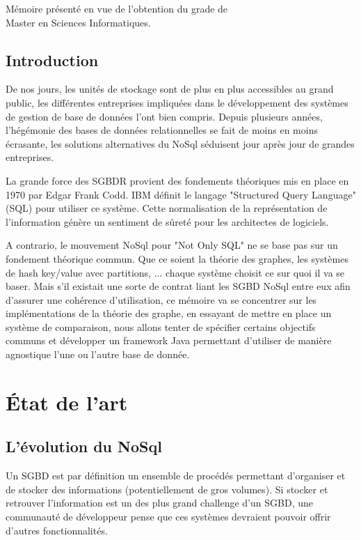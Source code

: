 \documentclass[a4paper,fleqn,12pt]{report}
\begin{document}
\vspace{0.5cm}
\begin{center}
M\'emoire pr\'esent\'e en vue de l'obtention du grade de\\
Master en Sciences Informatiques.
\end{center}
\tableofcontents
\newpage


\chapter*{Introduction}

De nos jours, les unités de stockage sont de plus en plus accessibles au grand public, les différentes entreprises impliquées dans le développement des systèmes de gestion de base de données l'ont bien compris. Depuis plusieurs années, l'hégémonie des bases de données relationnelles se fait de moins en moins écrasante, les solutions alternatives du NoSql séduisent jour après jour de grandes entreprises. 

La grande force des SGBDR provient des fondements théoriques mis en place en 1970 par Edgar Frank Codd. IBM définit le langage "Structured Query Language" (SQL) pour utiliser ce système. Cette normalisation de la représentation de l'information génère un sentiment de sûreté pour les architectes de logiciels.

A contrario, le mouvement NoSql pour "Not Only SQL" ne se base pas sur un fondement théorique commun. Que ce soient la théorie des graphes, les systèmes de hash key/value avec partitions, ... chaque système choisit ce sur quoi il va se baser. Mais s'il existait une sorte de contrat liant les SGBD NoSql entre eux afin d'assurer une cohérence d'utilisation, ce mémoire va se concentrer sur les implémentations de la théorie des graphe, en essayant de mettre en place un système de comparaison, nous allons tenter de spécifier certains objectifs communs et développer un framework Java permettant d'utiliser de manière agnostique l'une ou l'autre base de donnée.
 
\part{État de l'art}

\chapter{L'évolution du NoSql}
\label{NoSqlEvol}

Un SGBD est par définition un ensemble de procédés permettant d'organiser et de stocker des informations (potentiellement de gros volumes). Si stocker et retrouver l'information est un des plus grand challenge d'un SGBD, une communauté de développeur pense que ces systèmes devraient pouvoir offrir d'autres fonctionnalités. 
\end{document}
